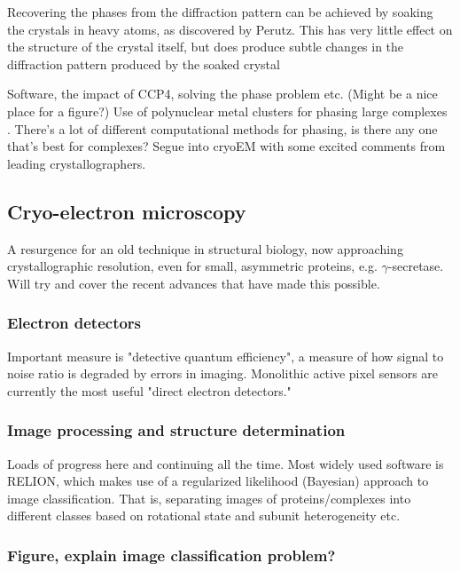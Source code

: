 \documentclass[a4paper,11pt,twoside,openright]{scrbook}
\let\cite\supercite
\begin{document}
Recovering the phases from the diffraction pattern can be achieved by soaking the crystals in heavy atoms, as discovered by Perutz. This has very little effect on the structure of the crystal itself, but does produce subtle changes in the diffraction pattern produced by the soaked crystal


Software, the impact of CCP4, solving the phase problem etc. (Might be a nice place for a figure?) Use of polynuclear metal clusters for phasing large complexes \cite{Dauter2005}. There's a lot of different computational methods for phasing, is there any one that's best for complexes? Segue into cryoEM with some excited comments from leading crystallographers.

\subsection{Cryo-electron microscopy}

A resurgence for an old technique in structural biology, now approaching crystallographic resolution, even for small, asymmetric proteins, e.g. \(\gamma\)-secretase. Will try and cover the recent advances that have made this possible.
\subsubsection{Electron detectors}
Important measure is "detective quantum efficiency", a measure of how signal to noise ratio is degraded by errors in imaging. Monolithic active pixel sensors are currently the most useful "direct electron detectors."
\subsubsection{Image processing and structure determination}
Loads of progress here and continuing all the time. Most widely used software is RELION, which makes use of a regularized likelihood (Bayesian) approach to image classification. That is, separating images of proteins/complexes into different classes based on rotational state and subunit heterogeneity etc.
\subsubsection{Figure, explain image classification problem?}
\end{document}
